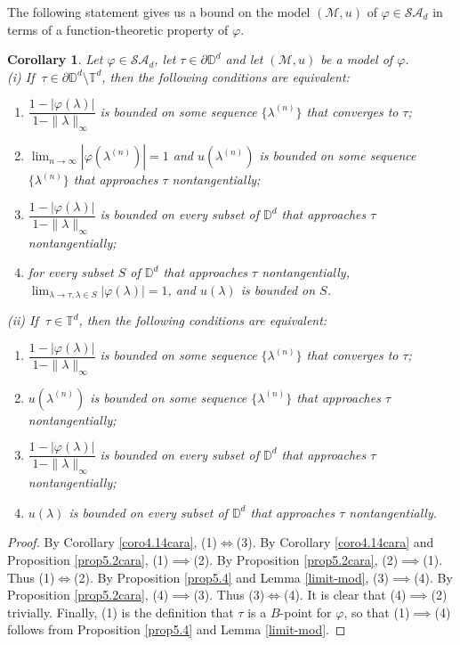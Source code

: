 \documentclass[11pt, reqno]{amsart}
\newtheorem{corollary}[theorem]{Corollary}
\newcommand\1{\boldsymbol {1}}
\newcommand{\T}{\mathbb{T}}
\newcommand{\D}{\mathbb{D}}
\newcommand\la{\lambda}
\numberwithin{equation}{section}
\begin{document}
The following statement gives us a bound on the model $(\mathcal{M},u)$ of $\varphi\in\mathcal{SA}_{d}$ in terms of a function-theoretic property of $\varphi$.

\begin{corollary}\label{coro5.7cara}
Let $\varphi\in\mathcal{SA}_{d}$, let $\tau\in\partial\mathbb{D}^{d}$ and let $(\mathcal{M},u)$ be a model of $\varphi$. \\
{\rm (i)} If $ \ \tau \in \partial \D^d \setminus\T^d$, then  the following conditions are equivalent: 
\begin{enumerate}
    \item $\dfrac{1-\lvert \varphi(\lambda) \rvert}{1-\|\lambda\|_{\infty}}$ is bounded on some sequence $\{\lambda^{(n)}\}$ that converges to $\tau$;
    \item $\lim_{n \to \infty} |\varphi(\lambda^{(n)})| =1$ and $u(\lambda^{(n)})$ is bounded on some sequence $\{\lambda^{(n)}\}$ that approaches $\tau$ nontangentially;
    \item $\dfrac{1-\lvert \varphi(\lambda) \rvert}{1-\|\lambda\|_{\infty}}$ is bounded on every subset of $\mathbb{D}^{d}$ that approaches $\tau$ nontangentially;
    \item for every subset $S$ of $\D^d$ that approaches $\tau$ nontangentially,  $\lim_{\la\to\tau, \la\in S} |\varphi(\lambda)| =1$, and  $ u(\lambda) $ is  bounded  on $S$.
\end{enumerate} 
{\rm (ii)} If $ \ \tau \in \T^d$, then  the following conditions are equivalent: 
\begin{enumerate}
    \item $\dfrac{1-\lvert \varphi(\lambda) \rvert}{1-\|\lambda\|_{\infty}}$ is bounded on some sequence $\{\lambda^{(n)}\}$ that converges to $\tau$;
    \item $u(\lambda^{(n)})$ is bounded on some sequence $\{\lambda^{(n)}\}$ that approaches $\tau$ nontangentially;
    \item $\dfrac{1-\lvert \varphi(\lambda) \rvert}{1-\|\lambda\|_{\infty}}$ is bounded on every subset of $\mathbb{D}^{d}$ that approaches $\tau$ nontangentially;
    \item $u(\lambda)$ is bounded on every subset of $\mathbb{D}^{d}$ that approaches $\tau$ nontangentially.
\end{enumerate}
\end{corollary}
\begin{proof} By Corollary \ref{coro4.14cara}, (1)$\iff$(3).
By Corollary \ref{coro4.14cara} and  Proposition \ref{prop5.2cara},  (1)$\implies$(2). By  Proposition \ref{prop5.2cara},  (2)$\implies$(1). Thus (1)$\iff$(2).
By  Proposition \ref{prop5.4} and Lemma \ref{limit-mod},  (3)$\implies$(4). By  Proposition \ref{prop5.2cara},  (4)$\implies$(3). Thus (3)$\iff$(4).
It is clear that  (4)$\implies$(2) trivially. Finally, (1) is the definition that $\tau$ is a $B$-point for $\varphi$, so that (1)$\implies$(4) follows from  Proposition \ref{prop5.4} and Lemma \ref{limit-mod}.  \end{proof}
\end{document}
